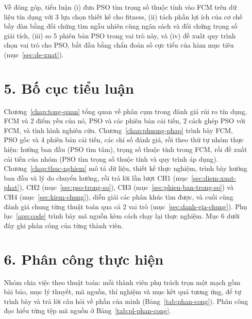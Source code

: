 Về đóng góp, tiểu luận (i) đưa PSO tìm trọng số thuộc tính vào FCM trên dữ liệu tín dụng với 3 lựa chọn thiết kế cho
fitness, (ii) tách phần lợi ích của cơ chế bầy đàn bằng đối chứng tìm ngẫu nhiên cùng ngân sách và đối chứng trọng số giải
tích, (iii) so 5 phiên bản PSO trong vai trò này, và (iv) đề xuất quy trình chọn vai trò cho PSO, bắt đầu bằng chẩn đoán
số cực tiểu của hàm mục tiêu (mục~\ref{sec:de-xuat}).

\section*{5. Bố cục tiểu luận}

Chương~\ref{chap:tong-quan} tổng quan về phân cụm trong đánh giá rủi ro tín dụng, FCM và 2 điểm yếu của nó, PSO và các
phiên bản cải tiến, 2 cách ghép PSO với FCM, và tình hình nghiên cứu. Chương~\ref{chap:phuong-phap} trình bày FCM, PSO gốc và
4 phiên bản cải tiến, các chỉ số đánh giá, rồi theo thứ tự nhóm thực hiện: hướng ban đầu (PSO tìm tâm), trọng số thuộc
tính trong FCM, rồi đề xuất cải tiến của nhóm (PSO tìm trọng số thuộc tính và quy trình áp dụng).
Chương~\ref{chap:thuc-nghiem} mô tả dữ liệu, thiết kế thực nghiệm, trình bày hướng ban đầu và lý do chuyển hướng, rồi trả lời
lần lượt CH1 (mục~\ref{sec:diem-xuat-phat}),
CH2 (mục~\ref{sec:pso-trong-so}), CH3 (mục~\ref{sec:phien-ban-trong-so}) và CH4 (mục~\ref{sec:kiem-chung}), diễn giải các
phân khúc tìm được, và cuối cùng đánh giá chung từng thuật toán qua cả 2 vai trò (mục~\ref{sec:danh-gia-chung}). Phụ lục~\ref{app:code} trình bày mã nguồn kèm cách chạy
lại thực nghiệm. Mục 6 dưới đây ghi phân công của từng thành viên.

\section*{6. Phân công thực hiện}

Nhóm chia việc theo thuật toán: mỗi thành viên phụ trách trọn một mạch gồm bài báo, mục lý thuyết, mã nguồn, thí nghiệm và
mục kết quả tương ứng, để tự trình bày và trả lời câu hỏi về phần của mình (Bảng~\ref{tab:phan-cong}). Phân công đọc hiểu
từng tệp mã nguồn ở Bảng~\ref{tab:pl-phan-cong}.

